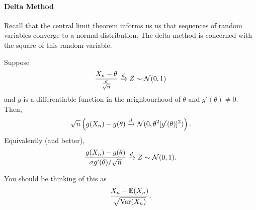 \paragraph{Delta Method}
Recall that the central limit theorem informs us us that sequences of random
variables converge to a normal distribution.
The delta-method is concerned with the square of this random variable.

Suppose \[
    \frac{X_n - \theta}{\frac{\sigma}{\sqrt{n}}} \xrightarrow{d} Z \sim \mathcal{N}(0, 1)
\] 
and \(g\) is a differentiable function in the neighbourhood of \(\theta\)
and \(g'(\theta) \neq 0\).
Then,  \[
    \sqrt{n} \left( g(X_n) - g(\theta) \xrightarrow{d} \mathcal{N}(0, \theta^2 [g'(\theta)]^2) \right) 
.\] 
Equivalently (and better), \[
    \frac{g(X_n) - g(\theta)}{\sigma g'(\theta)/\sqrt{n}}
    \xrightarrow{d} Z \sim \mathcal{N}(0, 1)
.\] 

You should be thinking of this as \[
    \frac{X_n - \mathbb{E}(X_n)}{\sqrt{\mathrm{Var}(X_n)}}
.\] 
